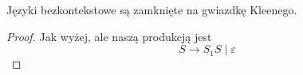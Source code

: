 \begin{theorem}
	Języki bezkontekstowe są zamknięte na gwiazdkę Kleenego.
\end{theorem}
\begin{proof}
	Jak wyżej, ale naszą produkcją jest
	\[
		S \rightarrow S_1S \mid \varepsilon
	\]
\end{proof}


